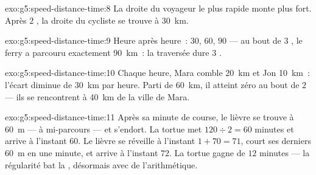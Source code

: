 \begin{solution}{exo:g5:speed-distance-time:8}
La droite du voyageur le plus rapide monte plus fort. Après $2$
, la droite du cycliste se trouve à \qty{30}{km}.
\end{solution}

\begin{solution}{exo:g5:speed-distance-time:9}
Heure après heure~: $30$, $60$, $90$ --- au bout de $3$ , le
ferry a parcouru exactement \qty{90}{km}~: la traversée dure $3$
.
\end{solution}

\begin{solution}{exo:g5:speed-distance-time:10}
Chaque heure, Mara comble \qty{20}{km} et Jon \qty{10}{km}~: l'écart
diminue de \qty{30}{km} par heure. Parti de \qty{60}{km}, il atteint
zéro au bout de $2$  --- ils se rencontrent à \qty{40}{km} de
la ville de Mara.
\end{solution}

\begin{solution}{exo:g5:speed-distance-time:11}
Après sa minute de course, le lièvre se trouve à \qty{60}{m} --- à
mi-parcours --- et s'endort. La tortue met $120 \div 2 = 60$ minutes
et arrive à l'instant $60$. Le lièvre se réveille à l'instant
$1 + 70 = 71$, court ses derniers \qty{60}{m} en une minute, et
arrive à l'instant $72$. La tortue gagne de $12$ minutes ---
la régularité bat la , désormais avec de l'arithmétique.
\end{solution}
